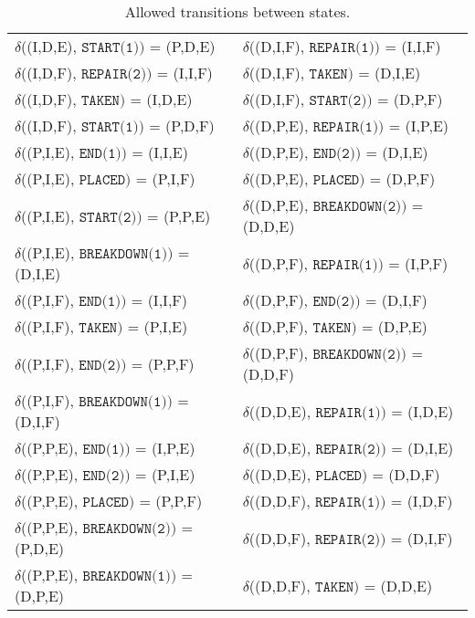 \begin{table}
\begin{tabular}{ll}
    $\delta$((I,D,E), $\texttt{START(1)})$ = (P,D,E)     & $\delta$((D,I,F), $\texttt{REPAIR(1)})$ = (I,I,F)     \\
    $\delta$((I,D,F), $\texttt{REPAIR(2)})$ = (I,I,F)    & $\delta$((D,I,F), $\texttt{TAKEN})$ = (D,I,E)         \\
    $\delta$((I,D,F), $\texttt{TAKEN})$ = (I,D,E)        & $\delta$((D,I,F), $\texttt{START(2)})$ = (D,P,F)      \\
    $\delta$((I,D,F), $\texttt{START(1)})$ = (P,D,F)     & $\delta$((D,P,E), $\texttt{REPAIR(1)})$ = (I,P,E)     \\
    $\delta$((P,I,E), $\texttt{END(1)})$ = (I,I,E)       & $\delta$((D,P,E), $\texttt{END(2)})$ = (D,I,E)        \\
    $\delta$((P,I,E), $\texttt{PLACED})$ = (P,I,F)       & $\delta$((D,P,E), $\texttt{PLACED})$ = (D,P,F)        \\
    $\delta$((P,I,E), $\texttt{START(2)})$ = (P,P,E)     & $\delta$((D,P,E), $\texttt{BREAKDOWN(2)})$ = (D,D,E)  \\
    $\delta$((P,I,E), $\texttt{BREAKDOWN(1)})$ = (D,I,E) & $\delta$((D,P,F), $\texttt{REPAIR(1)})$ = (I,P,F)     \\
    $\delta$((P,I,F), $\texttt{END(1)})$ = (I,I,F)       & $\delta$((D,P,F), $\texttt{END(2)})$ = (D,I,F)        \\
    $\delta$((P,I,F), $\texttt{TAKEN})$ = (P,I,E)        & $\delta$((D,P,F), $\texttt{TAKEN})$ = (D,P,E)         \\
    $\delta$((P,I,F), $\texttt{END(2)})$ = (P,P,F)       & $\delta$((D,P,F), $\texttt{BREAKDOWN(2)})$ = (D,D,F)  \\
    $\delta$((P,I,F), $\texttt{BREAKDOWN(1)})$ = (D,I,F) & $\delta$((D,D,E), $\texttt{REPAIR(1)})$ = (I,D,E)     \\
    $\delta$((P,P,E), $\texttt{END(1)})$ = (I,P,E)       & $\delta$((D,D,E), $\texttt{REPAIR(2)})$ = (D,I,E)     \\
    $\delta$((P,P,E), $\texttt{END(2)})$ = (P,I,E)       & $\delta$((D,D,E), $\texttt{PLACED})$ = (D,D,F)        \\
    $\delta$((P,P,E), $\texttt{PLACED})$ = (P,P,F)       & $\delta$((D,D,F), $\texttt{REPAIR(1)})$ = (I,D,F)     \\
    $\delta$((P,P,E), $\texttt{BREAKDOWN(2)})$ = (P,D,E) & $\delta$((D,D,F), $\texttt{REPAIR(2)})$ = (D,I,F)     \\
    $\delta$((P,P,E), $\texttt{BREAKDOWN(1)})$ = (D,P,E) & $\delta$((D,D,F), $\texttt{TAKEN})$ = (D,D,E)         \\
  \end{tabular}
  \caption{Allowed transitions between states.}
  \label{tbl:04.02_delta}
\end{table}
